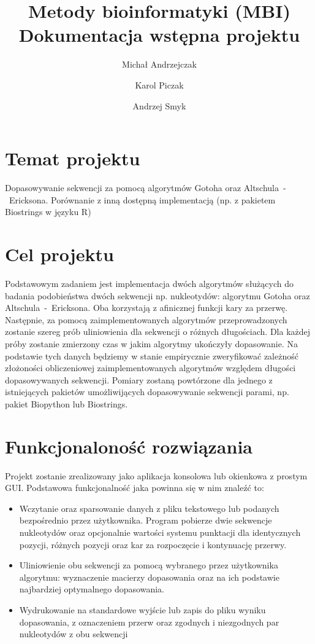 \documentclass[a4paper,10pt]{article}
\title{Metody bioinformatyki (MBI)\\Dokumentacja wstępna projektu}
\author{Michał Andrzejczak
		\and
		Karol Piczak
		\and
		Andrzej Smyk
		}
\begin{document}
	\maketitle
	\section{Temat projektu}

	Dopasowywanie sekwencji za pomocą algorytmów Gotoha oraz \linebreak\mbox{Altschula - Ericksona}. Porównanie z inną dostępną implementacją (np. z pakietem Biostrings w języku R)

	\section{Cel projektu}

	Podstawowym zadaniem jest implementacja dwóch algorytmów służących do badania podobieństwa dwóch sekwencji np. nukleotydów: algorytmu Gotoha oraz \mbox{Altschula - Ericksona}. Oba korzystają z afinicznej funkcji kary za przerwę. Następnie, za pomocą zaimplementowanych algorytmów przeprowadzonych zostanie szereg prób uliniowienia dla sekwencji o różnych długościach. Dla każdej próby zostanie zmierzony czas w jakim algorytmy ukończyły dopasowanie. Na podstawie tych danych będziemy w stanie empirycznie zweryfikować zależność złożoności obliczeniowej zaimplementowanych algorytmów względem długości dopasowywanych sekwencji. Pomiary zostaną powtórzone dla jednego z istniejących pakietów umożliwijących dopasowywanie sekwencji parami, np. pakiet Biopython lub Biostrings. 

	\section{Funkcjonaloność rozwiązania}

	Projekt zostanie zrealizowany jako aplikacja konsolowa lub okienkowa z prostym GUI. Podstawowa funkcjonalność jaka powinna się w nim znaleźć to:
	\begin{itemize}
		\item Wczytanie oraz sparsowanie danych z pliku tekstowego lub podanych bezpośrednio przez użytkownika. Program pobierze dwie sekwencje nukleotydów oraz opcjonalnie wartości systemu punktacji dla identycznych pozycji, różnych pozycji oraz kar za rozpoczęcie i kontynuację przerwy.
		\item Uliniowienie obu sekwencji za pomocą wybranego przez użytkownika algorytmu: wyznaczenie macierzy dopasowania oraz na ich podstawie najbardziej optymalnego dopasowania. 
		\item Wydrukowanie na standardowe wyjście lub zapis do pliku wyniku dopasowania, z oznaczeniem przerw oraz zgodnych i niezgodnych par nukleotydów z obu sekwencji
	\end{itemize}
\end{document}
